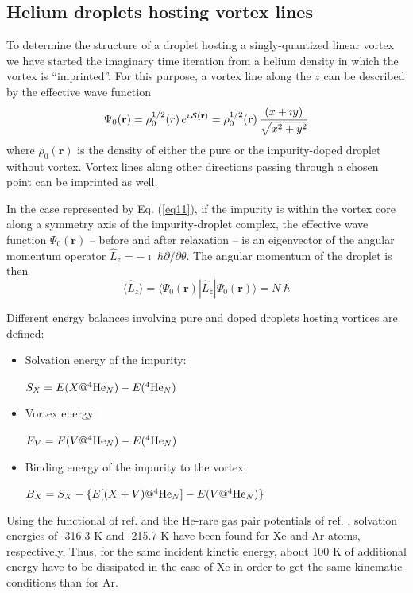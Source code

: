 \subsection{Helium droplets hosting vortex lines}

To determine the structure of a droplet hosting a singly-quantized linear vortex 
we have started the imaginary time iteration from a helium  
density in which the vortex is ``imprinted''. For this purpose, a vortex line
along the $z$  can be described by the effective wave function 
%
\begin{equation}
\Psi_0(\mathbf{r}) =  \rho_0^{1/2}(r) \, e^{\imath  \, {\cal S}(\mathbf{r})} = \rho_0^{1/2}(\mathbf{r}) \, \frac{(x + \imath y)}{\sqrt{x^2 + y^2}} 
\label{eq11}
\end{equation}
%
where $\rho_0(\mathbf{r})$ is the density of 
either the pure or  the impurity-doped droplet without vortex.  
Vortex lines along other directions passing through a chosen point 
can be imprinted as well.\cite{Pi07}
 
In the case represented by Eq. (\ref{eq11}), if the impurity is within the vortex
core along a symmetry axis of the impurity-droplet complex,
the effective wave function $\Psi_0({\mathbf r})$ -- before and after relaxation -- is an eigenvector of the  angular 
momentum operator  $\hat{L}_z = -\imath \; \hbar \partial/\partial \theta$. 
The angular momentum of the droplet is then
\begin{equation}
\langle \hat{L}_z \rangle = \langle \Psi_0(\mathbf{r}) | \hat{L}_z  | \Psi_0(\mathbf{r}) \rangle = N \; \hbar
\label{eq12}
\end{equation}
%

Different energy balances involving pure and doped droplets 
hosting vortices are defined:\cite{Pi07,Anc15,Dal00}
%
\begin{itemize}

\item
Solvation energy of the impurity:

$ S_X = E(X@^4{\rm He}_N) - E(^4{\rm He}_N)$

\item
Vortex  energy:

$E_V= E(V@^4{\rm He}_N) - E(^4{\rm He}_N)$

\item
Binding energy of the impurity to the vortex: 

$B_X = S_X - \{E[(X+V)@^4{\rm He}_N] - E(V@^4{\rm He}_N)\}$

\end{itemize}
%
Using the functional of ref. \cite{Anc05a} and the He-rare gas pair potentials of ref. \cite{Tan86}, solvation energies
of  -316.3 K and -215.7 K have been  found for Xe and Ar atoms, respectively. Thus, for the same incident kinetic
energy, about 100 K of additional energy have to be dissipated in the case of Xe in order to get the same kinematic conditions than for Ar.

